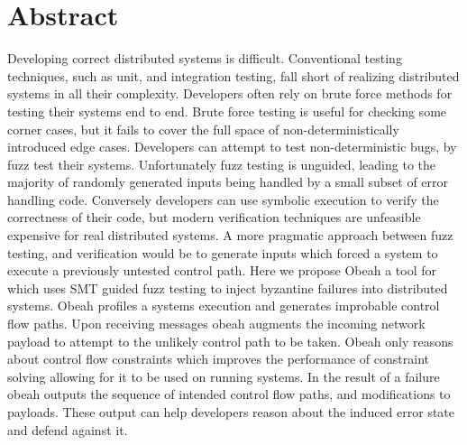 \section{Abstract}
\label{sec:abstract}

Developing correct distributed systems is difficult. Conventional testing
techniques, such as unit, and integration testing, fall short of realizing
distributed systems in all their complexity. Developers often rely on brute
force methods for testing their systems end to end. Brute force testing is
useful for checking some corner cases, but it fails to cover the full space of
non-deterministically introduced edge cases. Developers can attempt to test
non-deterministic bugs, by fuzz test their systems.  Unfortunately fuzz testing
is unguided, leading to the majority of randomly generated inputs being handled
by a small subset of error handling code. Conversely developers can use
symbolic execution to verify the correctness of their code, but modern
verification techniques are unfeasible expensive for real distributed systems.
A more pragmatic approach between fuzz testing, and verification would be to
generate inputs which forced a system to execute a previously untested control
path. Here we propose Obeah a tool for which uses SMT guided fuzz testing to
inject byzantine failures into distributed systems. Obeah profiles a systems
execution and generates improbable control flow paths. Upon receiving messages
obeah augments the incoming network payload to attempt to the unlikely control
path to be taken. Obeah only reasons about control flow constraints which
improves the performance of constraint solving allowing for it to be used on
running systems. In the result of a failure obeah outputs the sequence of
intended control flow paths, and modifications to payloads. These output can
help developers reason about the induced error state and defend against it.




